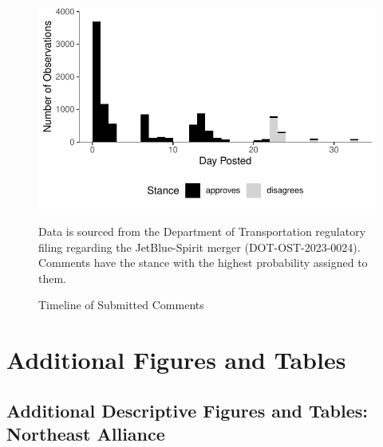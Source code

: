 \documentclass{article}
\begin{document}
\begin{appendices}
    \begin{figure}[h]
		\caption{Timeline of Submitted Comments}
		\label{fig:CommentTimeline}
		\includegraphics{stance_submission_timeline}
		\begin{minipage}{\textwidth} 
			{\footnotesize Data is sourced from the Department of Transportation regulatory filing regarding the JetBlue-Spirit merger  (DOT-OST-2023-0024). Comments have the stance with the highest probability assigned to them.} 
		\end{minipage}
	\end{figure}
	
	
	

	\FloatBarrier
	\pagebreak
	\section{Additional Figures and Tables}	

	\subsection{Additional Descriptive Figures and Tables: Northeast Alliance}
	
%			


\end{appendices}
\end{document}
